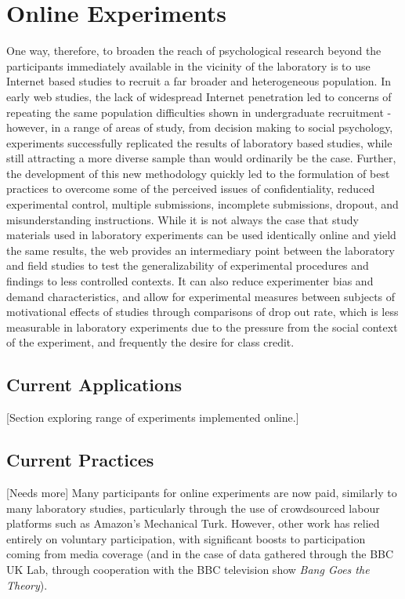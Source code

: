 \documentclass[12pt,a4paper,titlepage]{scrreprt}
\begin{document}
\section{Online Experiments}
One way, therefore, to broaden the reach of psychological research beyond the participants immediately available in the vicinity of the laboratory is to use Internet based studies to recruit a far broader and heterogeneous population. In early web studies, the lack of widespread Internet penetration led to concerns of repeating the same population difficulties shown in undergraduate recruitment - however, in a range of areas of study, from decision making to social psychology, experiments successfully replicated the results of laboratory based studies, while still attracting a more diverse sample than would ordinarily be the case\cite{krantz_comparing_1997,buchanan_using_1999,birnbaum_decision_2000,mcgraw_integrity_2000,gosling_should_2004,ritter_internet_2004}. Further, the development of this new methodology quickly led to the formulation of best practices to overcome some of the perceived issues of confidentiality, reduced experimental control, multiple submissions, incomplete submissions, dropout, and misunderstanding instructions\cite{reips_web_2000,reips_standards_2002,birnbaum_human_2004}. While it is not always the case that study materials used in laboratory experiments can be used identically online and yield the same results\cite{buchanan_nonequivalence_2005}, the web provides an intermediary point between the laboratory and field studies to test the generalizability of experimental procedures and findings to less controlled contexts. It can also reduce experimenter bias and demand characteristics, and allow for experimental measures between subjects of motivational effects of studies through comparisons of drop out rate\cite{reips_web_2000}, which is less measurable in laboratory experiments due to the pressure from the social context of the experiment, and frequently the desire for class credit.
\subsection{Current Applications}
[Section exploring range of experiments implemented online.]
\subsection{Current Practices}
[Needs more]
Many participants for online experiments are now paid, similarly to many laboratory studies, particularly through the use of crowdsourced labour platforms such as Amazon's Mechanical Turk\cite{buhrmester_amazons_2011,rand_promise_2012,crump_evaluating_2013}. However, other work has relied entirely on voluntary participation, with significant boosts to participation coming from media coverage (and in the case of data gathered through the BBC UK Lab, through cooperation with the BBC television show \textit{Bang Goes the Theory})\cite{owen_putting_2010,germine_is_2012,halberda_number_2012}.
\end{document}
